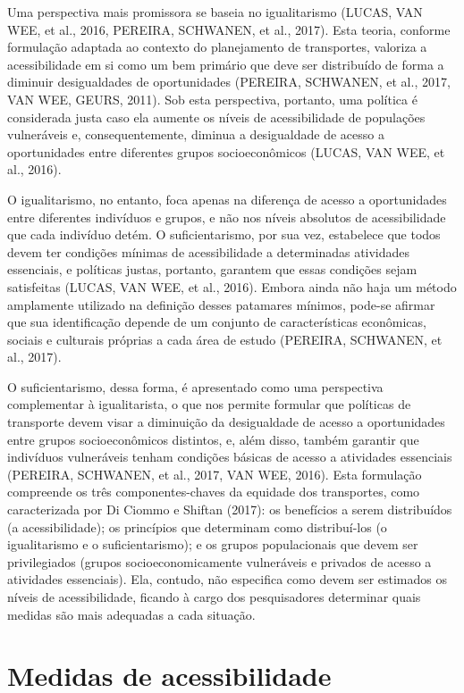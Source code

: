 \documentclass[msc,numbers]{coppe}
\begin{document}
  Uma perspectiva mais promissora se baseia no igualitarismo (LUCAS, VAN WEE, et al., 2016, PEREIRA, SCHWANEN, et al., 2017). Esta teoria, conforme formulação adaptada ao contexto do planejamento de transportes, valoriza a acessibilidade em si como um bem primário que deve ser distribuído de forma a diminuir desigualdades de oportunidades (PEREIRA, SCHWANEN, et al., 2017, VAN WEE, GEURS, 2011). Sob esta perspectiva, portanto, uma política é considerada justa caso ela aumente os níveis de acessibilidade de populações vulneráveis e, consequentemente, diminua a desigualdade de acesso a oportunidades entre diferentes grupos socioeconômicos (LUCAS, VAN WEE, et al., 2016).

  O igualitarismo, no entanto, foca apenas na diferença de acesso a oportunidades entre diferentes indivíduos e grupos, e não nos níveis absolutos de acessibilidade que cada indivíduo detém. O suficientarismo, por sua vez, estabelece que todos devem ter condições mínimas de acessibilidade a determinadas atividades essenciais, e políticas justas, portanto, garantem que essas condições sejam satisfeitas (LUCAS, VAN WEE, et al., 2016). Embora ainda não haja um método amplamente utilizado na definição desses patamares mínimos, pode-se afirmar que sua identificação depende de um conjunto de características econômicas, sociais e culturais próprias a cada área de estudo (PEREIRA, SCHWANEN, et al., 2017).

  O suficientarismo, dessa forma, é apresentado como uma perspectiva complementar à igualitarista, o que nos permite formular que políticas de transporte devem visar a diminuição da desigualdade de acesso a oportunidades entre grupos socioeconômicos distintos, e, além disso, também garantir que indivíduos vulneráveis tenham condições básicas de acesso a atividades essenciais (PEREIRA, SCHWANEN, et al., 2017, VAN WEE, 2016). Esta formulação compreende os três componentes-chaves da equidade dos transportes, como caracterizada por Di Ciommo e Shiftan (2017): os benefícios a serem distribuídos (a acessibilidade); os princípios que determinam como distribuí-los (o igualitarismo e o suficientarismo); e os grupos populacionais que devem ser privilegiados (grupos socioeconomicamente vulneráveis e privados de acesso a atividades essenciais). Ela, contudo, não especifica como devem ser estimados os níveis de acessibilidade, ficando à cargo dos pesquisadores determinar quais medidas são mais adequadas a cada situação.

  \hypertarget{medidas-de-acessibilidade}{%
  \section{Medidas de acessibilidade}\label{medidas-de-acessibilidade}}
\end{document}

